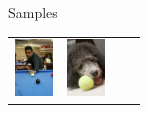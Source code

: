 \documentclass{beamer}
\newcommand{\samplesheight}{1.5cm}
\begin{document}
\begin{frame}{Samples}
\begin{table}[H]
\begin{tabularx}{\textwidth}{@{}XXXX@{}}
			\includegraphics[height=\samplesheight]{training_images/positive/n03145719_8658} &
			\includegraphics[height=\samplesheight]{training_images/positive/n04409515_2793} \\

\end{tabularx}
\end{table}
\end{frame}
\end{document}
